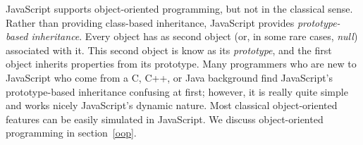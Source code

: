 JavaScript supports object-oriented programming, but not in the classical
sense. Rather than providing class-based inheritance, JavaScript provides
\emph{prototype-based inheritance}. Every object has as second object (or,
in some rare cases, \emph{null}) associated with it. This second object is
know as its \emph{prototype}, and the first object inherits properties from
its prototype. Many programmers who are new to JavaScript who come from a
C, C++, or Java background find JavaScript's prototype-based inheritance
confusing at first; however, it is really quite simple and works nicely
JavaScript's dynamic nature. Most classical object-oriented features can be
easily simulated in JavaScript. We discuss object-oriented programming
in section~\ref{oop}.


